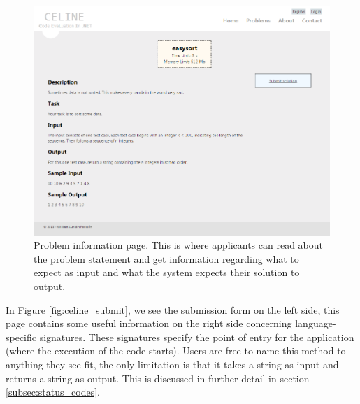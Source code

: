 \begin{figure}[h]
	\centering
	\includegraphics[width=1.0\textwidth]{chapters/media/celine_easysort.png}
	\caption{Problem information page. This is where applicants can read about the problem statement and get information regarding what to expect as input and what the system expects their solution to output.}
	\label{fig:celine_easysort}
\end{figure}

In Figure \ref{fig:celine_submit}, we see the submission form on the left side, this page contains some useful information on the right side concerning language-specific signatures. These signatures specify the point of entry for the application (where the execution of the code starts). Users are free to name this method to anything they see fit, the only limitation is that it takes a string as input and returns a string as output. This is discussed in further detail in section \ref{subsec:status_codes}.


